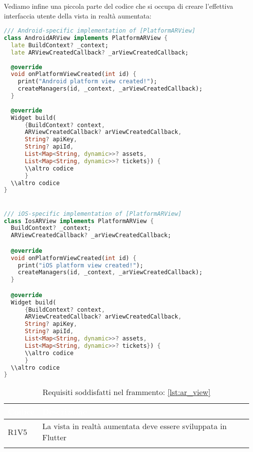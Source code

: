 Vediamo infine una piccola parte del codice che si occupa di creare l'effettiva interfaccia utente della vista in realtà aumentata:

\begin{lstlisting}[language=dart, label={lst:ar_view}, firstnumber=1,caption={Frammento di codice per vista in realtà aumenta in Dart}]
/// Android-specific implementation of [PlatformARView]
class AndroidARView implements PlatformARView {
  late BuildContext? _context;
  late ARViewCreatedCallback? _arViewCreatedCallback;
  
  @override
  void onPlatformViewCreated(int id) {
    print("Android platform view created!");
    createManagers(id, _context, _arViewCreatedCallback);
  }
  
  @override
  Widget build(
      {BuildContext? context,
      ARViewCreatedCallback? arViewCreatedCallback,
      String? apiKey,
      String? apiId,
      List<Map<String, dynamic>>? assets,
      List<Map<String, dynamic>>? tickets}) {
      \\altro codice
      }
  \\altro codice
}


/// iOS-specific implementation of [PlatformARView]
class IosARView implements PlatformARView {
  BuildContext? _context;
  ARViewCreatedCallback? _arViewCreatedCallback;

  @override
  void onPlatformViewCreated(int id) {
    print("iOS platform view created!");
    createManagers(id, _context, _arViewCreatedCallback);
  }

  @override
  Widget build(
      {BuildContext? context,
      ARViewCreatedCallback? arViewCreatedCallback,
      String? apiKey,
      String? apiId,
      List<Map<String, dynamic>>? assets,
      List<Map<String, dynamic>>? tickets}) {
      \\altro codice
      }
  \\altro codice
}
\end{lstlisting}

{
    \setlength{\freewidth}{\dimexpr\textwidth-10\tabcolsep}
    \renewcommand{\arraystretch}{1.5}
    \centering
    \setlength{\aboverulesep}{0pt}
    \setlength{\belowrulesep}{0pt}
    \begin{longtable}{C{.15\freewidth} C{1\freewidth}}
       \toprule
    \textcolor{white}{\textbf{Codice}}&
    \textcolor{white}{\textbf{Descrizione}}\\
    \toprule
    \endhead

    R1V5 & La vista in realtà aumentata deve essere sviluppata in Flutter\\
  
    \bottomrule
    \caption{Requisiti soddisfatti nel frammento: \ref{lst:ar_view}}
    \end{longtable}
}


